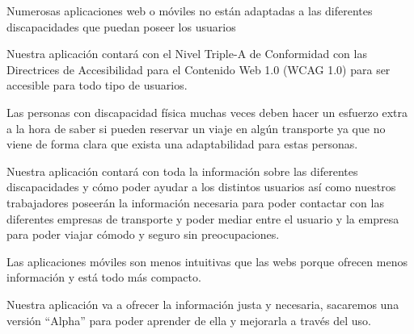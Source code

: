 \vspace{0.5cm}

\begin{problema}

    Numerosas aplicaciones web o móviles no están adaptadas a las diferentes discapacidades que puedan poseer los usuarios
    
    {\centering
    \begin{vision}\justifying \noindent
        Nuestra aplicación contará con el Nivel Triple-A de Conformidad con las Directrices de Accesibilidad para el Contenido Web 1.0 (WCAG 1.0) para ser accesible para todo tipo de usuarios.
    \end{vision}}
\end{problema}


\vspace{0.5cm}

\begin{problema}

    Las personas con discapacidad física muchas veces deben hacer un esfuerzo extra a la hora de saber si pueden reservar un viaje en algún transporte ya que no viene de forma clara que exista una adaptabilidad para estas personas.

    {\centering
    \begin{vision}\justifying \noindent
        Nuestra aplicación contará con toda la información sobre las diferentes discapacidades y cómo poder ayudar a los distintos usuarios así como nuestros trabajadores poseerán la información necesaria para poder contactar con las diferentes empresas de transporte y poder mediar entre el usuario y la empresa para poder viajar cómodo y seguro sin preocupaciones.
    \end{vision}}
\end{problema}
    
\newpage

\begin{problema}

    Las aplicaciones móviles son menos intuitivas que las webs porque ofrecen menos información y está todo más compacto.

    {\centering
    \begin{vision}\justifying \noindent
        Nuestra aplicación va a ofrecer la información justa y necesaria, sacaremos una versión “Alpha” para poder aprender de ella y mejorarla a través del uso.

    \end{vision}}
\end{problema}
    


